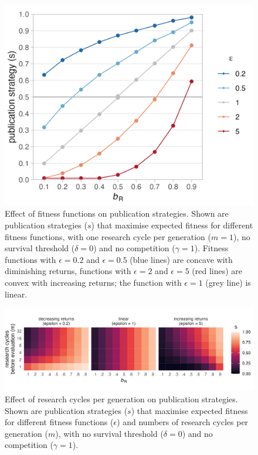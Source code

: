 \documentclass[
]{article}
\begin{document}
\begin{figure}[H]

{\centering \includegraphics[width=0.65\linewidth]{../plots/plot_epsilon_line_EF} 

}

\caption{Effect of fitness functions on publication strategies. Shown are publication strategies ($s$) that maximise expected fitness for different fitness functions, with one research cycle per generation ($m = 1$), no survival threshold ($\delta = 0$) and no competition ($\gamma = 1$). Fitness functions with $\epsilon = 0.2$ and $\epsilon = 0.5$ (blue lines) are concave with diminishing returns, functions with $\epsilon = 2$ and $\epsilon = 5$ (red lines) are convex with increasing returns; the function with $\epsilon = 1$ (grey line) is linear.}\label{fig:A1-epsilonplot}
\end{figure}

\begin{figure}[H]

{\centering \includegraphics[width=\textwidth]{../plots/plot_m_tile_EF} 

}

\caption{Effect of research cycles per generation on publication strategies. Shown are publication strategies ($s$) that maximise expected fitness for different fitness functions ($\epsilon$) and numbers of research cycles per generation ($m$), with no survival threshold ($\delta = 0$) and no competition ($\gamma = 1$).}\label{fig:A2-mplot}
\end{figure}
\end{document}
